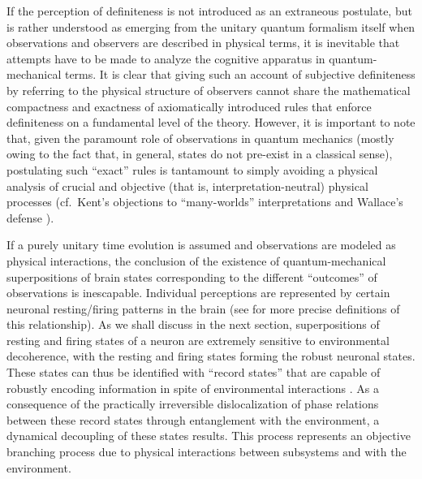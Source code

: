 \documentclass[twocolumn,aps,floatfix,amsmath,amssymb,showpacs,nofootinbib]{revtex4}
\begin{document}
If the perception of definiteness is not introduced as an extraneous
postulate, but is rather understood as emerging from the unitary
quantum formalism itself when observations and observers are described
in physical terms, it is inevitable that attempts have to be made to
analyze the cognitive apparatus in quantum-mechanical terms.  It is
clear that giving such an account of subjective definiteness by
referring to the physical structure of observers cannot share the
mathematical compactness and exactness of axiomatically introduced
rules that enforce definiteness on a fundamental level of the theory.
However, it is important to note that, given the paramount role of
observations in quantum mechanics (mostly owing to the fact that, in
general, states do not pre-exist in a classical sense), postulating
such ``exact'' rules is tantamount to simply avoiding a physical
analysis of crucial and objective (that is, interpretation-neutral)
physical processes (cf.\ Kent's objections to ``many-worlds''
interpretations \cite{Kent:1990:nm} and Wallace's defense
\cite{Wallace:2003:iz}).

If a purely unitary time evolution is assumed and observations are
modeled as physical interactions, the conclusion of the existence of
quantum-mechanical superpositions of brain states corresponding to the
different ``outcomes'' of observations is inescapable. Individual
perceptions are represented by certain neuronal resting/firing
patterns in the brain (see \cite{Donald:1995:lk,Donald:2002:um}
for more precise definitions of this relationship).  As we shall
discuss in the next section, superpositions of resting and firing
states of a neuron are extremely sensitive to environmental
decoherence, with the resting and firing states forming the robust
neuronal states. These states can thus be identified with ``record
states'' that are capable of robustly encoding information in spite of
environmental interactions \cite{Zurek:1998:re,Zurek:2004:yb}. As a
consequence of the practically irreversible dislocalization of phase
relations between these record states through entanglement with the
environment, a dynamical decoupling of these states results.  This
process represents an objective branching process due to physical
interactions between subsystems and with the environment.
\end{document}
